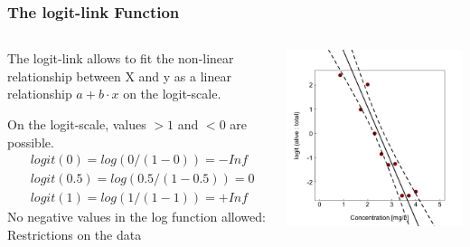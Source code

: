 \documentclass{beamer}
\begin{document}
\begin{frame}
    \frametitle{The logit-link Function}
    \begin{columns}
        \begin{column}{0.5\textwidth}
            The logit-link allows to fit the non-linear relationship between X and y as a linear relationship $a + b \cdot x$ on the logit-scale.
            \vspace{0.2cm}
            
            On the logit-scale, values $>1$ and $<0$ are possible.
            \begin{align*}
                &logit(0) = log(0/(1-0)) = -Inf \\
                &logit(0.5) = log(0.5/(1-0.5)) = 0 \\
                &logit(1) = log(1/(1-1)) = +Inf
            \end{align*}
            No negative values in the log function allowed: Restrictions on the data
        \end{column}
        \begin{column}{0.5\textwidth}
            \includegraphics[width=\textwidth]{lectures/day_9_refreshing_glm/figures/unnamed-chunk-17-1.png}
        \end{column}
    \end{columns}
\end{frame}
\end{document}
